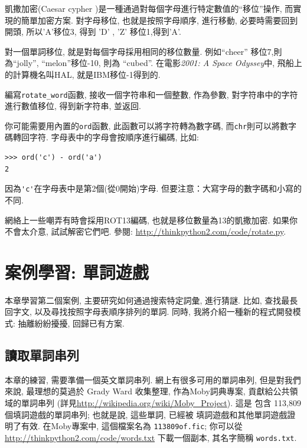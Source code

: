 \documentclass[10pt]{book}
\begin{document}
\begin{exercise}

\label{exrotate}
凱撒加密(Caesar cypher )是一種通過對每個字母進行特定數值的``移位''操作, 
而實現的簡單加密方案. 
對字母移位, 也就是按照字母順序, 進行移動, 必要時需要回到開頭,  
所以'A'移位3, 得到 'D' ,   'Z' 移位1,得到'A'. 

對一個單詞移位, 就是對每個字母採用相同的移位數量. 
例如``cheer'' 移位7,則為``jolly'',  ``melon''移位-10, 則為 ``cubed''. 
在電影{\em 2001: A Space Odyssey}中, 飛船上的計算機名叫HAL, 
就是IBM移位-1得到的. 


編寫\verb"rotate_word"函數, 接收一個字符串和一個整數, 作為參數, 
對字符串中的字符進行數值移位, 得到新字符串, 並返回. 

你可能需要用內置的{\tt ord}函數, 此函數可以將字符轉為數字碼, 
而{\tt chr}則可以將數字碼轉回字符. 
字母表中的字母會按順序進行編碼, 比如:

\begin{verbatim}
>>> ord('c') - ord('a')
2
\end{verbatim}
因為\verb"'c'"在字母表中是第2個(從0開始)字母. 
但要注意：大寫字母的數字碼和小寫的不同. 

網絡上一些嘲弄有時會採用ROT13編碼, 也就是移位數量為13的凱撒加密. 
如果你不會太介意, 試試解密它們吧. 參閱:
\url{http://thinkpython2.com/code/rotate.py}.

\end{exercise}


\chapter{案例學習: 單詞遊戲}
\label{wordplay}

本章學習第二個案例, 主要研究如何通過搜索特定詞彙, 進行猜謎. 
比如, 查找最長回字文, 以及尋找按照字母表順序排列的單詞. 
同時, 我將介紹一種新的程式開發模式: 抽離紛紛擾擾, 回歸已有方案. 


\section{讀取單詞串列}
\label{wordlist}
本章的練習, 需要準備一個英文單詞串列. 
網上有很多可用的單詞串列, 但是對我們來說, 最理想的莫過於
Grady Ward 收集整理, 作為Moby詞典專案, 貢獻給公共領域的單詞串列
(詳見\url{http://wikipedia.org/wiki/Moby_Project}). 這是
包含 113,809 個填詞遊戲的單詞串列; 也就是說, 這些單詞, 已經被
填詞遊戲和其他單詞遊戲證明了有效. 
在Moby專案中, 這個檔案名為 {\tt 113809of.fic};
你可以從\url{http://thinkpython2.com/code/words.txt} 下載一個副本, 
其名字簡稱 {\tt words.txt}. 
\end{document}
